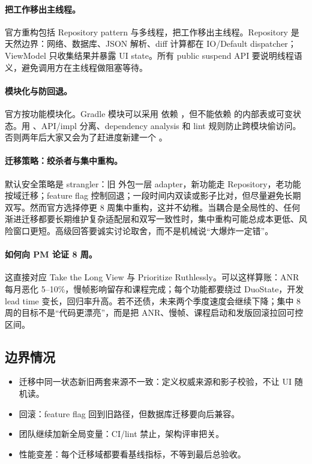 \paragraph{把工作移出主线程。} \srcofficial 官方重构包括 Repository pattern 与多线程，把工作移出主线程。\srcinferred Repository 是天然边界：网络、数据库、JSON 解析、diff 计算都在 IO/Default dispatcher；ViewModel 只收集结果并暴露 UI state。所有 public suspend API 要说明线程语义，避免调用方在主线程做阻塞等待。

\paragraph{模块化与防回退。} \srcofficial 官方按功能模块化。\srcinferred Gradle 模块可以采用  依赖 ，但不能依赖  的内部表或可变状态。用 、API/impl 分离、dependency analysis 和 lint 规则防止跨模块偷访问。否则两年后大家又会为了赶进度新建一个 。

\paragraph{迁移策略：绞杀者与集中重构。} 默认安全策略是 strangler：旧  外包一层 adapter，新功能走 Repository，老功能按域迁移；feature flag 控制回退；一段时间内双读或影子比对，但尽量避免长期双写。\srcinferred 然而官方选择停更 8 周集中重构，这并不幼稚。\srcofficial 当耦合是全局性的、任何渐进迁移都要长期维护复杂适配层和双写一致性时，集中重构可能总成本更低、风险窗口更短。高级回答要诚实讨论取舍，而不是机械说“大爆炸一定错”。

\paragraph{如何向 PM 论证 8 周。} \srcofficial 这直接对应 Take the Long View 与 Prioritize Ruthlessly。\srcinferred 可以这样算账：ANR 每月恶化 5--10\%，慢帧影响留存和课程完成；每个功能都要绕过 DuoState，开发 lead time 变长，回归率升高。若不还债，未来两个季度速度会继续下降；集中 8 周的目标不是“代码更漂亮”，而是把 ANR、慢帧、课程启动和发版回滚拉回可控区间。

\subsection{边界情况}

\begin{itemize}
  \item 迁移中同一状态新旧两套来源不一致：定义权威来源和影子校验，不让 UI 随机读。
  \item 回滚：feature flag 回到旧路径，但数据库迁移要向后兼容。
  \item 团队继续加新全局变量：CI/lint 禁止，架构评审把关。
  \item 性能变差：每个迁移域都要看基线指标，不等到最后总验收。
\end{itemize}

